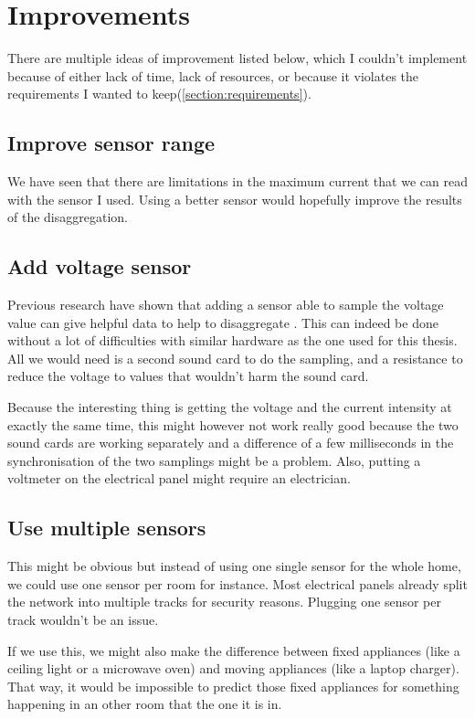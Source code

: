 \chapter{Improvements}\label{chapter-improvements}
There are multiple ideas of improvement listed below, which I couldn't implement because of either lack of time, lack of resources, or because it violates the requirements I wanted to keep(\autoref{section:requirements}).
\section{Improve sensor range}
We have seen that there are limitations in the maximum current that we can read with the sensor I used. Using a better sensor would hopefully improve the results of the disaggregation.

\section{Add voltage sensor}
Previous research have shown that adding a sensor able to sample the voltage value can give helpful data to help to disaggregate \cite{bruneel2018energy,hassan2014empirical,lam2007novel}. This can indeed be done without a lot of difficulties with similar hardware as the one used for this thesis. All we would need is a second sound card to do the sampling, and a resistance to reduce the voltage to values that wouldn't harm the sound card.

Because the interesting thing is getting the voltage and the current intensity at exactly the same time, this might however not work really good because the two sound cards are working separately and a difference of a few milliseconds in the synchronisation of the two samplings might be a problem. Also, putting a voltmeter on the electrical panel might require an electrician.

\section{Use multiple sensors}
This might be obvious but instead of using one single sensor for the whole home, we could use one sensor per room for instance. Most electrical panels already split the network into multiple tracks for security reasons. Plugging one sensor per track wouldn't be an issue. 

If we use this, we might also make the difference between fixed appliances (like a ceiling light or a microwave oven) and moving appliances (like a laptop charger). That way, it would be impossible to predict those fixed appliances for something happening in an other room that the one it is in.


